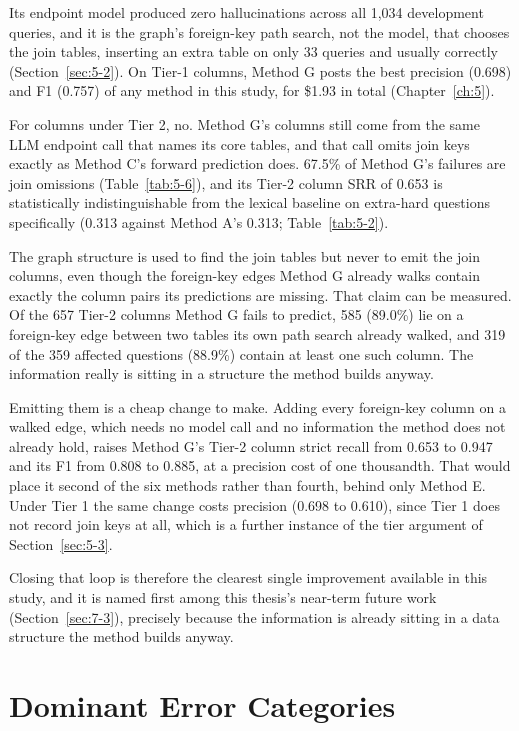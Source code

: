 Its endpoint model produced zero hallucinations across all 1,034 development queries, and it is the graph's foreign-key path search, not the model, that chooses the join tables, inserting an extra table on only 33 queries and usually correctly (Section~\ref{sec:5-2}). On Tier-1 columns, Method G posts the best precision (0.698) and F1 (0.757) of any method in this study, for \$1.93 in total (Chapter~\ref{ch:5}).

For columns under Tier 2, no. Method G's columns still come from the same LLM endpoint call that names its core tables, and that call omits join keys exactly as Method C's forward prediction does. 67.5\% of Method G's failures are join omissions (Table~\ref{tab:5-6}), and its Tier-2 column SRR of 0.653 is statistically indistinguishable from the lexical baseline on extra-hard questions specifically (0.313 against Method A's 0.313; Table~\ref{tab:5-2}).

The graph structure is used to find the join tables but never to emit the join columns, even though the foreign-key edges Method G already walks contain exactly the column pairs its predictions are missing. That claim can be measured. Of the 657 Tier-2 columns Method G fails to predict, 585 (89.0\%) lie on a foreign-key edge between two tables its own path search already walked, and 319 of the 359 affected questions (88.9\%) contain at least one such column. The information really is sitting in a structure the method builds anyway.

Emitting them is a cheap change to make. Adding every foreign-key column on a walked edge, which needs no model call and no information the method does not already hold, raises Method G's Tier-2 column strict recall from 0.653 to 0.947 and its F1 from 0.808 to 0.885, at a precision cost of one thousandth. That would place it second of the six methods rather than fourth, behind only Method E. Under Tier 1 the same change costs precision (0.698 to 0.610), since Tier 1 does not record join keys at all, which is a further instance of the tier argument of Section~\ref{sec:5-3}.

Closing that loop is therefore the clearest single improvement available in this study, and it is named first among this thesis's near-term future work (Section~\ref{sec:7-3}), precisely because the information is already sitting in a data structure the method builds anyway.

\section{Dominant Error Categories}\label{sec:6-4}

